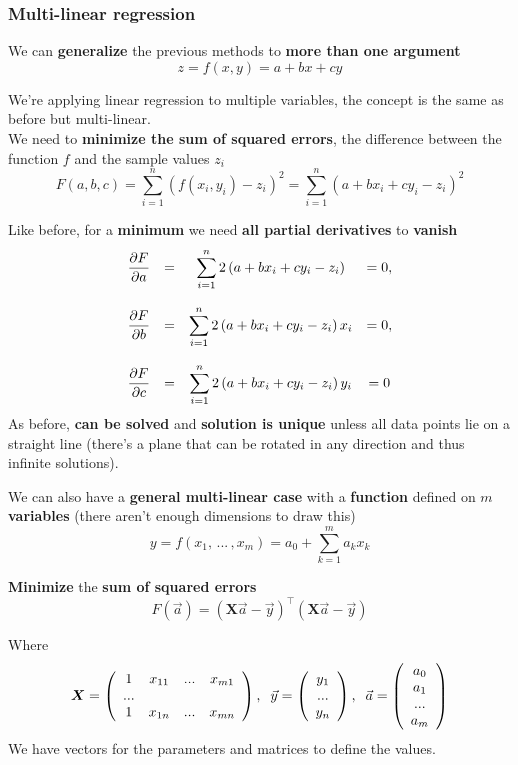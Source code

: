 \subsubsection{Multi-linear regression}
We can \textbf{generalize} the previous methods to \textbf{more than one argument}
$$ z = f(x,y) = a + bx + cy $$

We're applying linear regression to multiple variables, the concept is the same as before but multi-linear.\\

We need to \textbf{minimize the sum of squared errors}, the difference between the function $f$ and the sample values $z_i$
$$ F(a,b,c) = \sum_{i=1}^n \left(f (x_i, y_i) - z_i \right)^2 = \sum_{i=1}^n \left(a + b x_i + c y_i - z_i \right)^2 $$

Like before, for a \textbf{minimum} we need \textbf{all partial derivatives} to \textbf{vanish}
$$ \begin{array}{c c c c}
	\displaystyle \frac{\partial F}{\partial a} & = & \displaystyle \sum_{i=1}^n 2 \left(a + b x_i + c y_i - z_i \right) & = 0, \\
	\hfill \\
	\displaystyle \frac{\partial F}{\partial b} & = & \displaystyle \sum_{i=1}^n 2 \left(a + b x_i + c y_i - z_i \right)x_i & = 0, \\
	\hfill \\
	\displaystyle \frac{\partial F}{\partial c} & = & \displaystyle \sum_{i=1}^n 2 \left(a + b x_i + c y_i - z_i \right)y_i & = 0
\end{array} $$
As before, \textbf{can be solved} and \textbf{solution is unique} unless all data points lie on a straight line (there's a plane that can be rotated in any direction and thus infinite solutions).\\

\newpage

We can also have a \textbf{general multi-linear case} with a \textbf{function} defined on $m$ \textbf{variables} (there aren't enough dimensions to draw this)
$$ y = f(x_1, \, ... \, , x_m) = a_0 + \sum_{k=1}^m a_k x_k $$

\textbf{Minimize} the \textbf{sum of squared errors}
$$ F (\vec{a}) = \left(\bm{X} \vec{a} - \vec{y}\right)^{\top} \left(\bm{X} \vec{a} - \vec{y}\right)$$

Where
$$ 
\bm{X} = \left(
\begin{array}{c c c c}
	1 & x_{11} & ... & x_{m1} \\
	... \\
	1 & x_{1n} & ... & x_{mn}
\end{array}
\right), \;\;
\vec{y} = \left(
\begin{array}{c}
	y_1 \\
	...\\
	y_n
\end{array}
\right), \;\;
\vec{a} = \left(
\begin{array}{c}
	a_0\\
	a_1\\
	...\\
	a_m
\end{array}
\right)
$$
We have vectors for the parameters and matrices to define the values.\\

